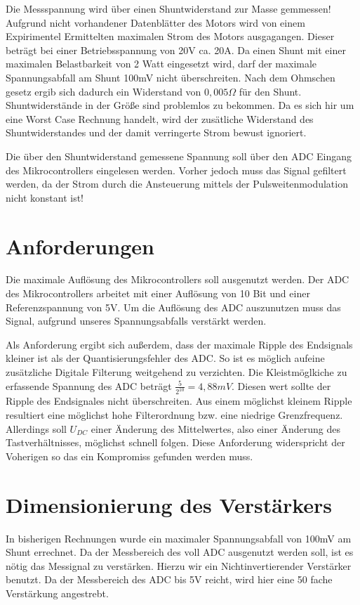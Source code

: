 \documentclass[11pt,twoside,a4paper,openright]{mpreport}
\begin{document}
Die Messspannung wird über einen Shuntwiderstand zur Masse gemmessen! Aufgrund nicht vorhandener Datenblätter des Motors
wird von einem Expirimentel Ermittelten maximalen Strom des Motors ausgagangen. Dieser beträgt bei einer Betriebsspannung von 20V ca. 20A.
Da einen Shunt mit einer maximalen Belastbarkeit von 2 Watt eingesetzt wird, darf der maximale Spannungsabfall am Shunt 100mV nicht überschreiten.
Nach dem Ohmschen gesetz ergib sich dadurch ein Widerstand von $0,005 \Omega$  für den Shunt. Shuntwiderstände in der Größe sind problemlos zu bekommen.
Da es sich hir um eine Worst Case Rechnung handelt, wird der zusätliche Widerstand des Shuntwiderstandes und der damit verringerte Strom bewust ignoriert.

Die über den Shuntwiderstand gemessene Spannung soll über den ADC Eingang des Mikrocontrollers eingelesen werden. Vorher jedoch muss das Signal gefiltert werden, da der Strom
durch die Ansteuerung mittels der Pulsweitenmodulation nicht konstant ist!



\section{Anforderungen}
Die maximale Auflösung des Mikrocontrollers soll ausgenutzt werden. Der ADC des Mikrocontrollers arbeitet mit einer Auflösung von 10 Bit und einer 
Referenzspannung von 5V. Um die Auflösung des ADC auszunutzen muss das Signal, aufgrund unseres Spannungsabfalls verstärkt werden.

Als Anforderung ergibt sich außerdem, dass der maximale Ripple des Endsignals kleiner ist als der Quantisierungsfehler des ADC.
So ist es möglich aufeine zusätzliche Digitale Filterung weitgehend zu verzichten.
Die Kleistmöglkiche zu erfassende Spannung des ADC beträgt $\frac{5}{2^{10}}=4,88mV$.
Diesen wert sollte der Ripple des Endsignales nicht überschreiten.
Aus einem möglichst kleinem Ripple resultiert eine möglichst hohe Filterordnung bzw. eine niedrige Grenzfrequenz.
Allerdings soll $U_{DC}$ einer Änderung des Mittelwertes, also einer Änderung des Tastverhältnisses, möglichst
schnell folgen. Diese Anforderung widerspricht der Voherigen so das ein Kompromiss gefunden werden muss.

\section{Dimensionierung des Verstärkers}

In bisherigen Rechnungen wurde ein maximaler Spannungsabfall von 100mV am Shunt errechnet. Da der Messbereich des voll ADC ausgenutzt werden soll,
ist es nötig das Messignal zu verstärken. Hierzu wir ein Nichtinvertierender Verstärker benutzt. Da der Messbereich des ADC bis 5V reicht, wird hier eine 
50 fache Verstärkung angestrebt.
\end{document}
